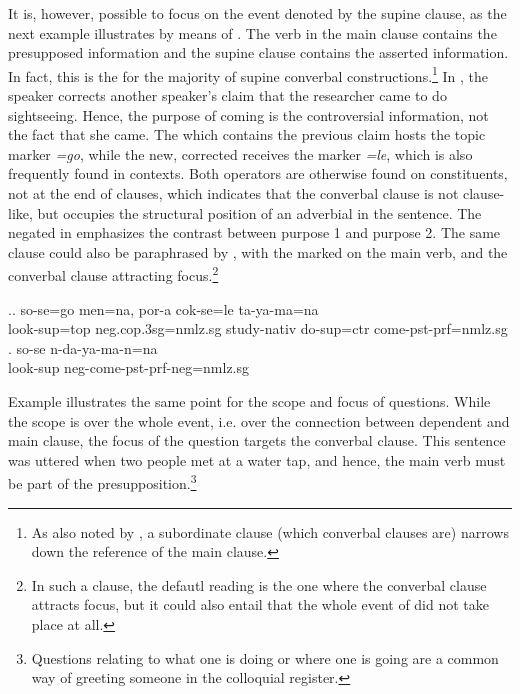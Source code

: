 It is, however, possible to focus on the event denoted by the supine clause, as the next example illustrates by means of . The  verb in the main clause contains the presupposed information and the supine clause contains the asserted information. In fact, this is the  for the majority of supine converbal constructions.\footnote{As also noted by \citet[12-7]{Haspelmath1995The-converb}, a subordinate clause (which converbal clauses are) narrows down the reference of the main clause.} In \Next[a], the speaker corrects another speaker's claim that the researcher came to do sightseeing. Hence, the purpose of coming is the controversial information, not the fact that she came. The  which contains the previous claim hosts the topic marker \emph{=go}, while the new, corrected   receives the  marker \emph{=le}, which is also frequently found in  contexts. Both operators are otherwise found on constituents, not at the end of clauses, which indicates that the converbal clause is not clause-like, but occupies the structural position of an adverbial in the sentence. The negated  in \Next[a] emphasizes the contrast between purpose 1 and purpose 2. The same clause could also be paraphrased by \Next[b], with the  marked on the main verb, and the converbal clause attracting focus.\footnote{In such a clause, the defautl reading is the one where the converbal clause attracts focus, but it could also entail that the whole event of  did not take place at all.} 
 	
\ex.\ag. so-se=go   men=na,     por-a         cok-se=le ta-ya-ma=na\\
look{\sc -sup=top} {\sc neg.cop.3sg=nmlz.sg} study{\sc -nativ} do{\sc -sup=ctr} come{\sc [3sg]-pst-prf=nmlz.sg}\\
\bg. so-se n-da-ya-ma-n=na\\
look{\sc -sup} {\sc neg-}come{\sc [3sg]-pst-prf-neg=nmlz.sg}\\


Example \Next illustrates the same point for the scope and focus of questions. While the scope is over the whole event, i.e. over the connection between dependent and main clause, the focus of the question targets the converbal clause. This sentence was uttered when two people met at a water tap, and hence, the main verb  must be part of the presupposition.\footnote{Questions relating to what one is doing or where one is going are a common way of greeting someone in the colloquial register.}

